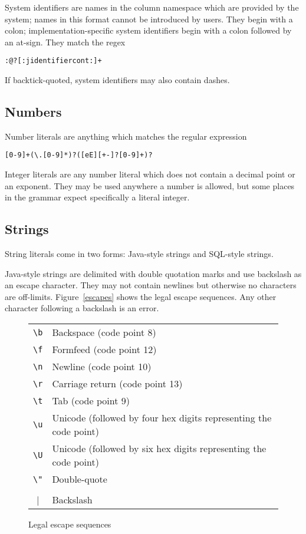 \documentclass{article}
\begin{document}
System identifiers are names in the column namespace which are
provided by the system; names in this format cannot be introduced by
users.  They begin with a colon; implementation-specific system identifiers
begin with a colon followed by an at-sign.  They match the regex
\begin{lstlisting}
:@?[:jidentifiercont:]+
\end{lstlisting}
If backtick-quoted, system identifiers may also contain dashes.

\subsection{Numbers}
Number literals are anything which matches the regular expression
\begin{lstlisting}
[0-9]+(\.[0-9]*)?([eE][+-]?[0-9]+)?
\end{lstlisting}
Integer literals are any number literal which does not contain a
decimal point or an exponent.  They may be used anywhere a number is
allowed, but some places in the grammar expect specifically a literal
integer.

\subsection{Strings}
String literals come in two forms: Java-style strings and SQL-style
strings.

Java-style strings are delimited with double quotation marks and use
backslash as an escape character.  They may not contain newlines but
otherwise no characters are off-limits.  Figure~\vref{escapes} shows
the legal escape sequences.  Any other character following a backslash
is an error.
\begin{figure}
\begin{center}
\begin{tabular}{c l}
\lstinline|\b| & Backspace (code point 8) \\
\lstinline|\f| & Formfeed (code point 12) \\
\lstinline|\n| & Newline (code point 10) \\
\lstinline|\r| & Carriage return (code point 13) \\
\lstinline|\t| & Tab (code point 9) \\
\lstinline|\u| & Unicode (followed by four hex digits representing the code point) \\
\lstinline|\U| & Unicode (followed by six hex digits representing the code point) \\
\lstinline|\"| & Double-quote \\
\lstinline|\\| & Backslash \\
\end{tabular}
\end{center}
\caption{Legal escape sequences}
\label{escapes}
\end{figure}
\end{document}
